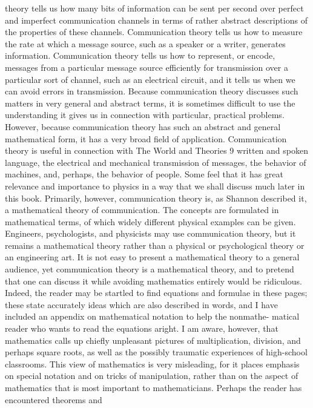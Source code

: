 theory tells us how many bits of information can be sent per second
over perfect and imperfect communication channels in terms of
rather abstract descriptions of the properties of these channels.
Communication theory tells us how to measure the rate at which
a message source, such as a speaker or a writer, generates information.
Communication theory tells us how to represent, or encode,
messages from a particular message source efficiently for transmission
over a particular sort of channel, such as an electrical
circuit, and it tells us when we can avoid errors in transmission.
Because communication theory discusses such matters in very
general and abstract terms, it is sometimes difficult to use the
understanding it gives us in connection with particular, practical
problems. However, because communication theory has such an
abstract and general mathematical form, it has a very broad field
of application. Communication theory is useful in connection with
The World and Theories 9
written and spoken language, the electrical and mechanical transmission
of messages, the behavior of machines, and, perhaps, the
behavior of people. Some feel that it has great relevance and
importance to physics in a way that we shall discuss much later
in this book.
Primarily, however, communication theory is, as Shannon described
it, a mathematical theory of communication. The concepts
are formulated in mathematical terms, of which widely different
physical examples can be given. Engineers, psychologists, and
physicists may use communication theory, but it remains a mathematical
theory rather than a physical or psychological theory or
an engineering art.
It is not easy to present a mathematical theory to a general
audience, yet communication theory is a mathematical theory,
and to pretend that one can discuss it while avoiding mathematics
entirely would be ridiculous. Indeed, the reader may be startled
to find equations and formulae in these pages; these state accurately
ideas which are also described in words, and I have included
an appendix on mathematical notation to help the nonmathe-
matical reader who wants to read the equations aright.
I am aware, however, that mathematics calls up chiefly unpleasant
pictures of multiplication, division, and perhaps square roots,
as well as the possibly traumatic experiences of high-school classrooms.
This view of mathematics is very misleading, for it places
emphasis on special notation and on tricks of manipulation, rather
than on the aspect of mathematics that is most important to mathematicians.
Perhaps the reader has encountered theorems and
